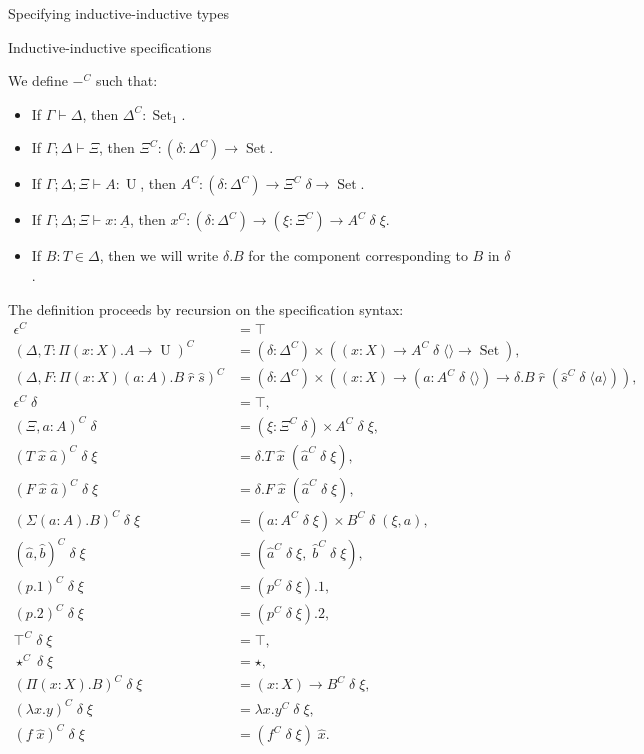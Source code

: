 \documentclass[acmsmall,review]{acmart}\settopmatter{printfolios=true,printccs=false,printacmref=false}
\DeclareMathOperator{\USet}{Set}
\DeclareMathOperator{\UU}{U}
\newcommand{\tac}{\vdash}
\def\emptytuple{\langle\rangle}
\begin{document}
\begin{section}{Specifying inductive-inductive types}
\begin{subsection}{Inductive-inductive specifications}
\begin{definition}
We define $-^C$ such that:
\begin{itemize}
    \item If $\Gamma \tac \Delta$, then $\Delta^C : \USet_1$.
    \item If $\Gamma ; \Delta \tac \Xi$, then $\Xi^C : (\delta : \Delta^C) \to \USet$.
    \item If $\Gamma ; \Delta ; \Xi \tac A : \UU$, then $A^C : (\delta : \Delta^C) \to \Xi^C\;\delta \to \USet$.
    \item If $\Gamma ; \Delta ; \Xi \tac x : \underline{A}$, then $x^C : (\delta : \Delta^C) \to (\xi : \Xi^C) \to A^C\;\delta\;\xi$.
    \item If $B : T \in \Delta$, then we will write $\delta . B$ for the component corresponding to $B$ in $\delta$. %
\end{itemize}
The definition proceeds by recursion on the specification syntax:
\begin{align*}
\epsilon^C &= \top\\
(\Delta , T : \Pi(x : X).A \to \UU)^C &= (\delta : \Delta^C)\times ((x : X) \to A^C\;\delta\;\emptytuple \to \USet),\\
(\Delta , F : \Pi(x : X)(a : A).B\;\hat{r}\;\hat{s})^C &= (\delta : \Delta^C) \times ((x : X) \to (a : A^C\;\delta\;\emptytuple) \to \delta.B\;\hat{r}\;(\hat{s}^C\;\delta\;\langle a \rangle)),\\
\epsilon^C\;\delta &= \top,\\
(\Xi , a : A)^C\;\delta &= (\xi : \Xi^C\;\delta) \times A^C\;\delta\;\xi,\\
(T\;\hat{x}\;\hat{a})^C\;\delta\;\xi &= \delta.T\;\hat{x}\;(\hat{a}^C\;\delta\;\xi),\\
(F\;\hat{x}\;\hat{a})^C\;\delta\;\xi &= \delta.F\;\hat{x}\;(\hat{a}^C\;\delta\;\xi),\\
(\Sigma(a : A).B)^C\;\delta\;\xi & = (a : A^C\;\delta\;\xi) \times B^C\;\delta\;(\xi , a),\\
(\hat{a} , \hat{b})^C\;\delta\;\xi & = (\hat{a}^C\;\delta\;\xi ,\; \hat{b}^C\;\delta\;\xi),\\
(p.1)^C\;\delta\;\xi &= (p^C\;\delta\;\xi).1,\\
(p.2)^C\;\delta\;\xi &= (p^C\;\delta\;\xi).2,\\
\top^C\;\delta\;\xi &= \top,\\
\star^C\;\delta\;\xi &= \star,\\
(\Pi(x : X).B)^C\;\delta\;\xi &= (x : X) \to B^C\;\delta\;\xi,\\
(\lambda x.y)^C\;\delta\;\xi &= \lambda x. y^C\;\delta\;\xi,\\
(f\;\hat{x})^C\;\delta\;\xi &= (f^C\;\delta\;\xi)\;\hat{x}.
\end{align*}


\end{definition}
\end{subsection}
\end{section}
\end{document}
